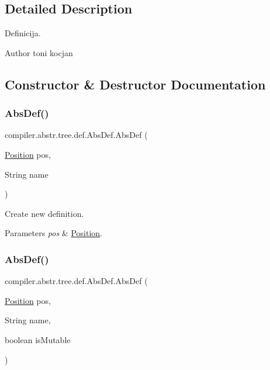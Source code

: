 \subsection{Detailed Description}
Definicija.

\begin{DoxyAuthor}{Author}
toni kocjan 
\end{DoxyAuthor}


\subsection{Constructor \& Destructor Documentation}
\mbox{\label{classcompiler_1_1abstr_1_1tree_1_1def_1_1_abs_def_ab981c24e02c5ff191c2f4ebf6093cfe1}} 
\subsubsection{\texorpdfstring{Abs\+Def()}{AbsDef()}\hspace{0.1cm}{\footnotesize\ttfamily [1/3]}}
{\footnotesize\ttfamily compiler.\+abstr.\+tree.\+def.\+Abs\+Def.\+Abs\+Def (\begin{DoxyParamCaption}\item[{\hyperlink{classcompiler_1_1_position}{Position}}]{pos,  }\item[{String}]{name }\end{DoxyParamCaption})}

Create new definition.


\begin{DoxyParams}{Parameters}
{\em pos} & \hyperlink{classcompiler_1_1_position}{Position}. \\
\hline
\end{DoxyParams}
\mbox{\label{classcompiler_1_1abstr_1_1tree_1_1def_1_1_abs_def_acd677af4998506aa1c35f897ff6ea2e0}} 
\subsubsection{\texorpdfstring{Abs\+Def()}{AbsDef()}\hspace{0.1cm}{\footnotesize\ttfamily [2/3]}}
{\footnotesize\ttfamily compiler.\+abstr.\+tree.\+def.\+Abs\+Def.\+Abs\+Def (\begin{DoxyParamCaption}\item[{\hyperlink{classcompiler_1_1_position}{Position}}]{pos,  }\item[{String}]{name,  }\item[{boolean}]{is\+Mutable }\end{DoxyParamCaption})}

